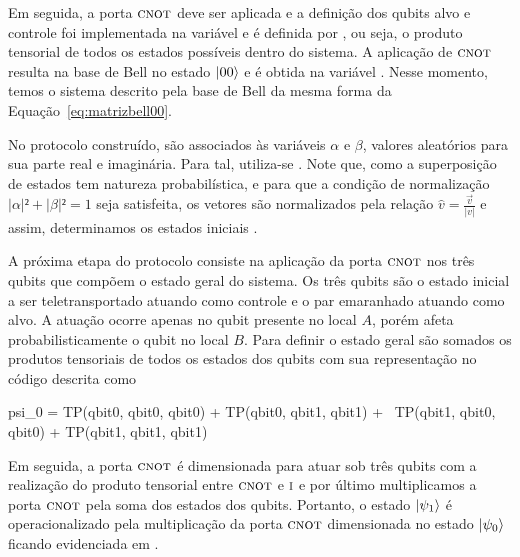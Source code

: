 Em seguida, a porta \(\operatorname{\textsc{cnot}}\) deve ser aplicada e a definição dos qubits alvo e controle foi implementada na variável  e é definida por , ou seja, o produto tensorial de todos os estados possíveis dentro do sistema. A aplicação de \(\operatorname{\textsc{cnot}}\) resulta na base de Bell no estado $\ket{00}$ e é obtida na variável . Nesse momento, temos o sistema descrito pela base de Bell da mesma forma da Equação~\eqref{eq:matrizbell00}.

No protocolo construído, são associados às variáveis $\alpha$ e $\beta$, valores aleatórios para sua parte real e imaginária. Para tal, utiliza-se . Note que, como a superposição de estados tem natureza probabilística, e para que a condição de normalização $|\alpha|² + |\beta|² = 1$ seja satisfeita, os vetores são normalizados pela relação $\widehat{v}= \frac{\vec{v}}{|v|}$ e assim, determinamos os estados iniciais .

A próxima etapa do protocolo consiste na aplicação da porta \(\operatorname{\textsc{cnot}}\) nos três qubits que compõem o estado geral do sistema. Os três qubits são o estado inicial a ser teletransportado atuando como controle e o par emaranhado atuando como alvo. A atuação ocorre apenas no qubit presente no local \(A\), porém afeta probabilisticamente o qubit no local \(B\). Para definir o estado geral são somados os produtos tensoriais de todos os estados dos qubits com sua representação no código descrita como
\begin{pycode}
  psi_0 = TP(qbit0, qbit0, qbit0) + TP(qbit0, qbit1, qbit1) + \
          TP(qbit1, qbit0, qbit0) + TP(qbit1, qbit1, qbit1)
\end{pycode}
Em seguida, a porta \(\operatorname{\textsc{cnot}}\) é dimensionada para atuar sob três qubits com a realização do produto tensorial entre \(\operatorname{\textsc{cnot}}\) e \(\operatorname{\textsc{i}}\) e por último multiplicamos a porta \(\operatorname{\textsc{cnot}}\) pela soma dos estados dos qubits. Portanto, o estado $\ket{\psi_1}$ é operacionalizado pela multiplicação da porta \(\operatorname{\textsc{cnot}}\) dimensionada no estado $\ket{\psi_0}$ ficando evidenciada em .

